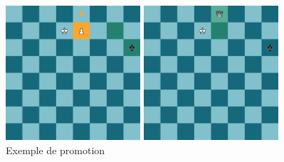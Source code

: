 \documentclass{article}
\begin{document}
\begin{figure}[H]
    \centering
    \begin{minipage}[b]{0.45\textwidth}
        \centering
        \includegraphics[width=\textwidth,height=5cm,keepaspectratio]{promotion1.png}
    \end{minipage}
    \hspace{0.005\textwidth}
    \begin{minipage}[b]{0.45\textwidth}
        \centering
        \includegraphics[width=\textwidth,height=5cm,keepaspectratio]{promotion2.png}
    \end{minipage}
    \caption{Exemple de promotion}
\end{figure}
\end{document}
